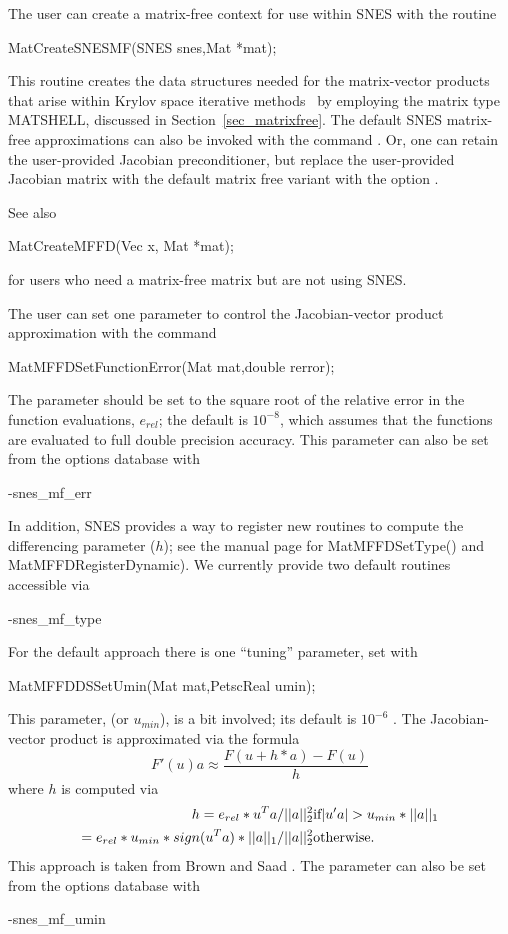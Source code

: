 The user can create a matrix-free context for use within SNES with 
the routine
\begin{tabbing}
  MatCreateSNESMF(SNES snes,Mat *mat);
\end{tabbing}
This routine creates the data structures needed for the matrix-vector 
products that arise within Krylov space iterative methods~\cite{brownsaad:90}
by employing the matrix type MATSHELL, 
discussed in Section~\ref{sec_matrixfree}.  The default SNES matrix-free
approximations can also be invoked with the command . 
Or, one can retain the user-provided Jacobian preconditioner, but replace the 
user-provided Jacobian matrix with the default matrix free variant with the
option . 

See also
\begin{tabbing}
  MatCreateMFFD(Vec x, Mat *mat);
\end{tabbing}
for users who need a matrix-free matrix but are not using SNES.

The user can set one parameter to control the Jacobian-vector
product approximation with the command
\begin{tabbing}
  MatMFFDSetFunctionError(Mat mat,double rerror);
\end{tabbing}
The parameter  should be set to the square root of the 
relative error in the function evaluations, $e_{rel}$; the default is $ 10^{-8} $, 
which assumes that the functions are evaluated to full double precision accuracy. 
This parameter can also be set from the options database with 
\begin{tabbing}
   -snes\_mf\_err 
\end{tabbing}

In addition, SNES provides a way to register new routines to compute the differencing parameter ($h$);
see the manual page for MatMFFDSetType() and MatMFFDRegisterDynamic). We currently provide two default routines accessible via
\begin{tabbing}
  -snes\_mf\_type 
\end{tabbing}
For the default approach there is one ``tuning'' parameter, set with 
\begin{tabbing}
  MatMFFDDSSetUmin(Mat mat,PetscReal umin);
\end{tabbing}
This parameter,  (or $u_{min}$), is a bit involved; its default is 
$ 10^{-6} $ . The Jacobian-vector product is approximated via the formula
\[
    F'(u) a \approx \frac{F(u + h*a) - F(u)}{h}
\]
where $ h $ is computed via 
\begin{eqnarray*}
        h = e_{rel}*u^{T}a/||a||^2_2                       &    \hbox{if}  |u'a| > u_{min}*||a||_{1} \\
          = e_{rel}*u_{min}*sign(u^{T}a)*||a||_{1}/||a||^2_2  &    \hbox{otherwise}.
\end{eqnarray*}
This approach is taken from Brown and Saad \cite{brownsaad:90}.
The parameter can also be set from the options database with 
\begin{tabbing}
   -snes\_mf\_umin 
\end{tabbing}

